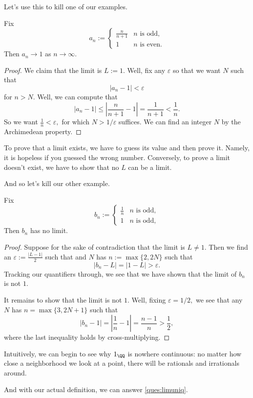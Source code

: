 Let's use this to kill one of our examples.
\begin{exercise}
	Fix
	\[a_n:=\begin{cases}
		\frac n{n+1} & n\text{ is odd}, \\
		1 & n\text{ is even}.
	\end{cases}\]
	Then $a_n\to1$ as $n\to\infty.$
\end{exercise}
\begin{proof}
	We claim that the limit is $L:=1.$ Well, fix any $\varepsilon$ so that we want $N$ such that
	\[|a_n-1|<\varepsilon\]
	for $n>N.$ Well, we can compute that
	\[|a_n-1|\le\left|\frac n{n+1}-1\right|=\frac1{n+1}<\frac1n.\]
	So we want $\frac1n<\varepsilon,$ for which $N>1/\varepsilon$ suffices. We can find an integer $N$ by the Archimedean property.
\end{proof}
\begin{remark}
	To prove that a limit exists, we have to guess its value and then prove it. Namely, it is hopeless if you guessed the wrong number. Conversely, to prove a limit doesn't exist, we have to show that no $L$ can be a limit.
\end{remark}
And so let's kill our other example.
\begin{exercise}
	Fix
	\[b_n:=\begin{cases}
		\frac1n & n\text{ is odd}, \\
		1 & n\text{ is odd},
	\end{cases}\]
	Then $b_n$ has no limit.
\end{exercise}
\begin{proof}
	Suppose for the sake of contradiction that the limit is $L\ne1.$ Then we find an $\varepsilon:=\frac{|L-1|}2$ such that and $N$ has $n:=\max\{2,2N\}$ such that
	\[|b_n-L|=|1-L|>\varepsilon.\]
	Tracking our quantifiers through, we see that we have shown that the limit of $b_n$ is not $1.$

	It remains to show that the limit is not $1.$ Well, fixing $\varepsilon=1/2,$ we see that any $N$ has $n=\max\{3,2N+1\}$ such that
	\[|b_n-1|=\left|\frac1n-1\right|=\frac{n-1}n>\frac12,\]
	where the last inequality holds by cross-multiplying.
\end{proof}
\begin{remark}
	Intuitively, we can begin to see why $1_\QQ$ is nowhere continuous: no matter how close a neighborhood we look at a point, there will be rationals and irrationals around.
\end{remark}
And with our actual definition, we can answer \autoref{ques:limuniq}.
